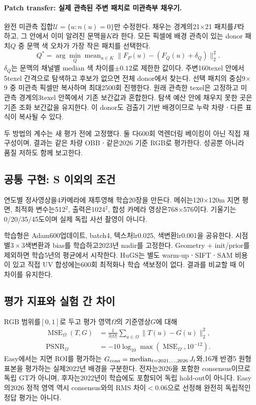 \documentclass[11pt,a4paper]{article}
\newcommand{\med}{\operatorname{median}}
\newcommand{\mean}{\operatorname{mean}}
\begin{document}
\paragraph{Patch transfer: 실제 관측된 주변 패치로 미관측부 채우기.}
완전 미관측 집합$\mathcal U=\{u:n(u)=0\}$만 수정한다. 채우는 경계의21$\times$21 패치를$P$라 하고, 그 안에서 이미 알려진 문맥을$K$라 한다. 모든 픽셀에 배경 관측이 있는 donor 패치$Q$ 중 문맥 색 오차가 가장 작은 패치를 선택한다.
\begin{equation}
 Q^*=\arg\min_Q\mean_{u\in K}\|F_P(u)-(F_Q(u)+\delta_Q)\|_2^2.
\end{equation}
$\delta_Q$는 문맥의 채널별 median 색 차이를$\pm0.12$로 제한한 값이다. 주변160texel 안에서5texel 간격으로 탐색하고 후보가 없으면 전체 donor에서 찾는다. 선택 패치의 중심9$\times$9 중 미관측 픽셀만 복사하며 최대2500회 진행한다. 원래 관측한 texel은 고정하고 미관측 경계의3texel 안쪽에서 기존 보간값과 혼합한다. 탐색 예산 안에 채우지 못한 곳은 기존 조화 보간값을 유지한다. 이 donor도 검출기 기반 배경이므로 누락 차량ㆍ다른 표식이 복사될 수 있다.

두 방법의 계수는 새 평가 전에 고정했다. 둘 다600회 역렌더링 베이킹이 아닌 직접 재구성이며, 결과는 같은 차량 OBBㆍ같은2026 기준 RGB로 평가한다. 성공뿐 아니라 품질 저하도 함께 보고한다.

\subsection{공통 구현: S 이외의 조건}
연도별 정사영상을4카메라에 재투영해 학습20장을 만든다. 메쉬는120$\times$120m 지면 평면, 최적화 변수는512$^2$, 출력은1024$^2$, 합성 카메라 영상은768$\times$576이다. 기울기는0/20/35/45도이며 실제 독립 사선 촬영이 아니다.

학습형은 Adam600업데이트, batch4, 텍스처lr0.025, 색변환lr0.001을 공유한다. 시점별$3\times3$색변환과 bias를 학습하고2023년 nadir를 고정한다. Geometry + init/prior를 제외하면 학습5년의 평균에서 시작한다. HuGS는 별도 warm-upㆍSIFTㆍSAM 비용이 있고 직접 UV 합성에는600회 최적화나 학습 색보정이 없다. 결과를 비교할 때 이 차이를 유지한다.

\subsection{평가 지표와 실험 간 차이}
RGB 범위를$[0,1]$로 두고 평가 영역$\Omega$의 기준영상$G$에 대해
\begin{align}
 \operatorname{MSE}_{\Omega}(T,G)&=\frac1{3|\Omega|}\sum_{u\in\Omega}\|T(u)-G(u)\|_2^2,\\
 \operatorname{PSNR}_{\Omega}&=-10\log_{10}\max(\operatorname{MSE}_{\Omega},10^{-12}).
\end{align}
Easy에서는 지면 ROI를 평가하는 $G_{\rm cons}=\med_{t=2021,\ldots,2026}J_t$와,16개 반경5 원형 표본을 평가하는 실제2022년 배경을 구분한다. 전자는2026을 포함한 consensus이므로 독립 GT가 아니며, 후자는2022년이 학습에도 포함되어 독립 hold-out이 아니다. Easy의2026 정적 영역 역시 consensus와의 RMS 차이$<0.06$으로 선정해 완전히 독립적인 정답 평가는 아니다.
\end{document}
